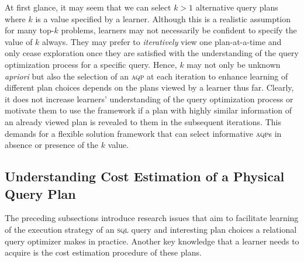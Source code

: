 \documentclass[11pt]{article}
\begin{document}
At first glance, it may seem that we can select $k>1$ alternative query plans where $k$ is a value specified by a learner. Although this is a realistic assumption for many top-$k$ problems, learners may not necessarily be confident to specify the value of $k$ always. They may prefer to \textit{iteratively} view one plan-at-a-time and only cease exploration once they are satisfied with the understanding of the query optimization process for a specific query. Hence, $k$ may not only be unknown \textit{apriori} but also the selection of an \textsc{aqp} at each iteration to enhance learning of different plan choices depends on the plans viewed by a learner thus far. Clearly, it does not increase learners' understanding of the query optimization process or motivate them to use the framework if a plan with highly similar information of an already viewed plan is revealed to them in the subsequent iterations. This demands for a flexible solution framework that can select informative \textsc{aqp}s in absence or presence of the $k$ value. 


\subsection{Understanding Cost Estimation of a Physical Query Plan}  \label{sec:cost}
The preceding subsections introduce research issues that aim to facilitate learning of the execution strategy of an \textsc{sql} query and  interesting plan choices a relational query optimizer makes in practice. Another key knowledge that a learner needs to acquire is the cost estimation procedure of these plans.   
\end{document}
